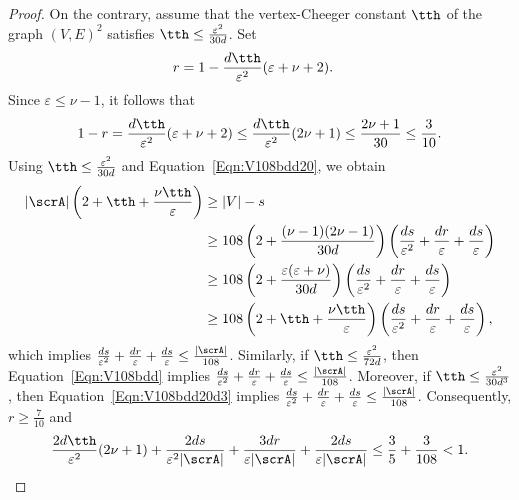 \begin{proof}
On the contrary, assume that the vertex-Cheeger constant $\tth$ of the graph $(V, E)^2$ satisfies $\tth \leq  \frac{\varepsilon^{2}}{30d}$. 
Set 
\begin{align*}
r & =  1- \frac {d \tth}{ \varepsilon^2}  ( \varepsilon + \nu + 2).
\end{align*}
Since $\varepsilon \leq \nu -1$, it follows that 
$$
1 - r = \frac {d \tth}{ \varepsilon^2}  ( \varepsilon + \nu + 2)
\leq \frac {d \tth}{ \varepsilon^2}  (2\nu+1) 
\leq \frac{2\nu +1}{30}
\leq \frac 3{10}.$$
Using $\tth \leq  \frac{\varepsilon^{2}}{30d}$ and Equation~\eqref{Eqn:V108bdd20}, we obtain 
\begin{align*}
|\scrA| \left( 2 + \tth + \frac {\nu \tth} {\varepsilon} \right) 
& \geq 
|V| - s\\
& \geq 
108 \left( 2 + \frac {(\nu-1)(2\nu -1)} {30d}  \right)  
\left( \frac{ds}{\varepsilon^2} + \frac{dr}\varepsilon + \frac{ds}{\varepsilon}\right) \\
& \geq 
108 \left( 2 + \frac {\varepsilon (\varepsilon  + \nu)} {30d}  \right)  
\left( \frac{ds}{\varepsilon^2} + \frac{dr}\varepsilon + \frac{ds}{\varepsilon}\right) \\
& \geq 
108 \left( 2 + \tth + \frac {\nu\tth} {\varepsilon} \right)  
\left( \frac{ds}{\varepsilon^2} + \frac{dr}\varepsilon + \frac{ds}{\varepsilon}\right) ,
\end{align*}
which implies 
$ \frac{ ds}{\varepsilon^2 }
+ \frac{ dr}{\varepsilon } + \frac{ds}{\varepsilon}\leq \frac{|\scrA|}{108}$. 
Similarly, if $\tth \leq  \frac{\varepsilon^{2}}{72d}$, then Equation~\eqref{Eqn:V108bdd} implies 
$ \frac{ ds}{\varepsilon^2 }
+ \frac{ dr}{\varepsilon } + \frac{ds}{\varepsilon} \leq \frac{|\scrA|}{108}$. 
Moreover, if $\tth \leq  \frac{\varepsilon^{2}}{30d^3}$, then Equation~\eqref{Eqn:V108bdd20d3} implies 
$ \frac{ ds}{\varepsilon^2 }
+ \frac{ dr}{\varepsilon } + \frac{ds}{\varepsilon}\leq \frac{|\scrA|}{108}$. Consequently, $r\geq \frac 7{10}$ and 
$$
\frac {2d\tth} { \varepsilon^2} ( 2\nu + 1) 
+ \frac{2d s}{\varepsilon^2 |\scrA|}
+ \frac{3dr}{\varepsilon |\scrA|}
+ \frac{2ds}{\varepsilon |\scrA|}
\leq 
\frac 3{5} + \frac 3 {108} 
< 1.
$$
 

\end{proof}
